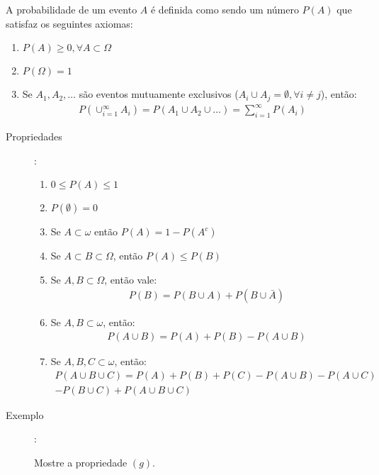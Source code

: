 \documentclass[11pt,a4paper]{book}
\begin{document}
A probabilidade de um evento $A$ é definida como sendo um número $P(A)$ que satisfaz
os seguintes axiomas:
\begin{enumerate}[leftmargin=*, label=\Roman*., widest=IV, align=left]
  \item $P(A) \ge 0, \forall A \subset \Omega$
  \item $P(\Omega)=1$
  \item Se $A_1, A_2,\ldots$ são eventos mutuamente exclusivos ($A_i \cup A_j = \emptyset, \forall i \neq j$), então:
    \begin{align}
      P(\cup^\infty_{i=1} A_i)= P(A_1\cup A_2 \cup \ldots)= \sum^\infty_{i=1} P(A_i) 
    \end{align}
\end{enumerate}
\begin{description}
  \item[Propriedades]:

    \begin{enumerate}[label=(\alph*)]
      \item $0 \le P(A) \le 1$
      \item $P(\emptyset)=0$
      \item Se $A \subset \omega$ então $P(A)=1-P(A^c)$
      \item Se $A \subset B \subset \Omega$, então $P(A) \le P(B)$
      \item Se $A,B \subset \Omega$, então vale:
        \begin{align}
          P(B)= P(B\cup A)+ P(B\cup \bar{A})
        \end{align}
      \item Se $A,B \subset \omega$, então:
        \begin{align}
          P(A\cup B)= P(A)+P(B)-P(A\cup B)
        \end{align}
      \item Se $A,B,C \subset \omega$, então:
        \begin{align}
          P(A\cup B \cup C)= P(A)+P(B)+P(C)-P(A \cup B)- P(A \cup C) \nonumber\\-
          P(B\cup C)+P(A\cup B \cup C) 
        \end{align}
    \end{enumerate}
  \item [Exemplo]: 

    Mostre a propriedade $(g)$.


\end{description}
\end{document}
